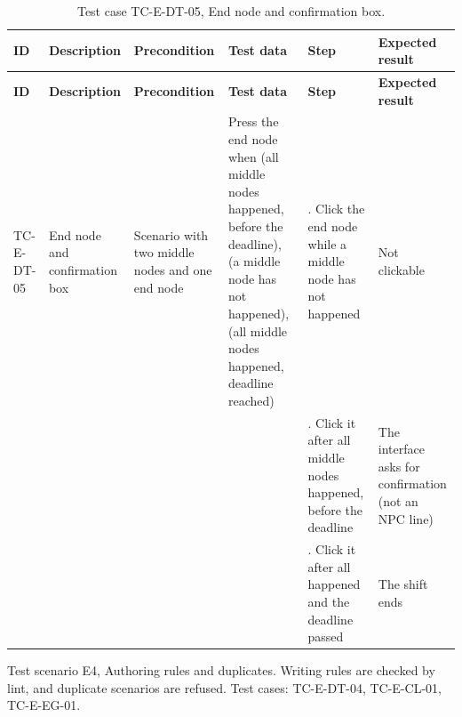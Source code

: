 {\footnotesize{}\renewcommand{\arraystretch}{1.1}
\begin{longtable}{|>{\raggedright\arraybackslash}p{}|>{\raggedright\arraybackslash}p{}|>{\raggedright\arraybackslash}p{}|>{\raggedright\arraybackslash}p{}|>{\raggedright\arraybackslash}p{}|>{\raggedright\arraybackslash}p{}|}
\caption{Test case TC-E-DT-05, End node and confirmation box.} \\
\hline
\textbf{ID} & \textbf{Description} & \textbf{Precondition} & \textbf{Test data} & \textbf{Step} & \textbf{Expected result} \\ \hline
\endfirsthead
\hline
\textbf{ID} & \textbf{Description} & \textbf{Precondition} & \textbf{Test data} & \textbf{Step} & \textbf{Expected result} \\ \hline
\endhead
TC-E-DT-05 & End node and confirmation box & Scenario with two middle nodes and one end node & Press the end node when (all middle nodes happened, before the deadline), (a middle node has not happened), (all middle nodes happened, deadline reached) & 1. Click the end node while a middle node has not happened & Not clickable \\ \cline{5-6}
 &  &  &  & 2. Click it after all middle nodes happened, before the deadline & The interface asks for confirmation (not an NPC line) \\ \cline{5-6}
 &  &  &  & 3. Click it after all happened and the deadline passed & The shift ends \\ \hline
\end{longtable}
}

Test scenario E4, Authoring rules and duplicates. Writing rules are checked by lint, and duplicate scenarios are refused. Test cases: TC-E-DT-04, TC-E-CL-01, TC-E-EG-01.

